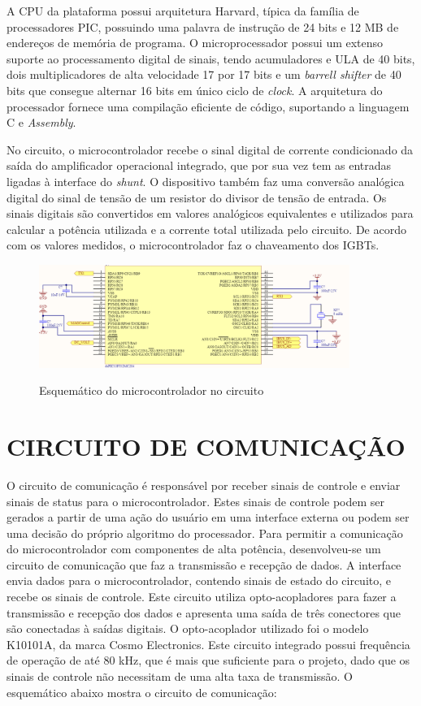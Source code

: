 A CPU da plataforma possui arquitetura Harvard, típica da família de processadores PIC, possuindo uma palavra de instrução de 24 bits e 12 MB de endereços de memória de programa. O microprocessador possui um extenso suporte ao processamento digital de sinais, tendo acumuladores e ULA de 40 bits, dois multiplicadores de alta velocidade 17 por 17 bits e um \textit{barrell shifter} de 40 bits que consegue alternar 16 bits em único ciclo de \textit{clock}. A arquitetura do processador fornece uma compilação eficiente de código, suportando a linguagem C e \textit{Assembly}.

No circuito, o microcontrolador recebe o sinal digital de corrente  condicionado da saída do amplificador operacional integrado, que por sua vez tem as entradas ligadas à interface do \textit{shunt}. O dispositivo também faz uma conversão analógica digital do sinal de tensão de um resistor do divisor de tensão de entrada. Os sinais digitais são convertidos em valores analógicos equivalentes e utilizados para calcular a potência utilizada e a corrente total utilizada pelo circuito. De acordo com os valores medidos, o microcontrolador faz o chaveamento dos IGBTs.

\begin{figure}[H]
    \centering
    \caption{Esquemático do microcontrolador no circuito}
    \includegraphics[width=0.9\textwidth]{./dados/figuras/proj-uc}
    \label{fig:figura-dspic}
\end{figure}


\section{CIRCUITO DE COMUNICAÇÃO}
\label{sec:commCircuit}
O circuito de comunicação é responsável por receber sinais de controle e enviar sinais de status para o microcontrolador. Estes sinais de controle podem ser gerados a partir de uma ação do usuário em uma interface externa ou podem ser uma decisão do próprio algoritmo do processador. Para permitir a comunicação do microcontrolador com componentes de alta potência, desenvolveu-se um circuito de comunicação que faz a transmissão e recepção de dados. A interface envia dados para o microcontrolador, contendo sinais de estado do circuito, e recebe os sinais de controle. Este circuito utiliza opto-acopladores para fazer a transmissão e recepção dos dados e apresenta uma saída de três conectores que são conectadas à saídas digitais. O  opto-acoplador utilizado foi o modelo K10101A, da marca Cosmo Electronics. Este circuito integrado possui frequência de operação de até 80 kHz, que é mais que suficiente para o projeto, dado que os sinais de controle não necessitam de uma alta taxa de transmissão. O esquemático abaixo mostra o circuito de comunicação:

